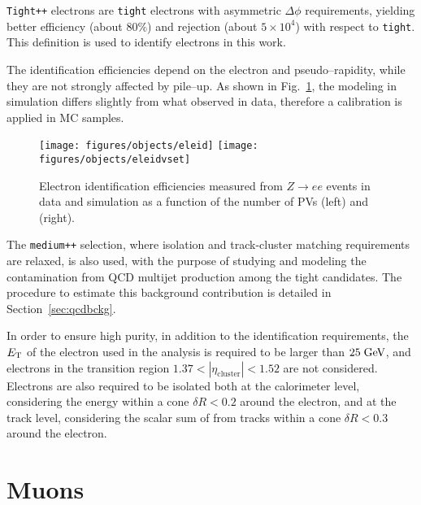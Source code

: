 \texttt{Tight++} electrons are \texttt{tight} electrons with
asymmetric $\Delta\phi$ requirements, yielding better efficiency
(about $80\%$) and rejection (about $5\times 10^4$) with respect to
\texttt{tight}. This definition is used to identify electrons in this
work.

The identification efficiencies depend on the electron \pt{} and
pseudo--rapidity, while they are not strongly affected by pile--up. As
shown in Fig.~\ref{fig:eleeff}, the modeling in simulation differs
slightly from what observed in data, therefore a calibration is
applied in MC samples.

\begin{figure}[htb!]\centering
  \texttt{[image: figures/objects/eleid]}
  \texttt{[image: figures/objects/eleidvset]}
  \caption{Electron identification efficiencies measured from
    $Z\to ee$ events in data and simulation as a function of the
    number of PVs (left) and ~\et{} (right).}
  \label{fig:eleeff}
\end{figure}

The \texttt{medium++} selection, where isolation and track-cluster matching
requirements are relaxed, is also used, with the purpose of studying
and modeling the contamination from QCD multijet production among the
tight candidates.
The procedure to estimate this background
contribution is detailed in Section~\ref{sec:qcdbckg}.

In order to ensure high purity, in addition to the identification
requirements, the $\mbox{\ensuremath{E_{\mathrm{T}}}}$ of the electron used in the analysis is required
to be larger than \mbox{$25 \; \mathrm{GeV}{}$}, and electrons in the transition
region $1.37<|\eta_{\mathrm{cluster}}|<1.52$ are not
considered. Electrons are also required to be isolated both at the
calorimeter level, considering the energy within a cone $\delta R<0.2$
around the electron, and at the track level, considering the scalar
sum of \pt{} from tracks within a cone $\delta R <0.3$ around the
electron. 

\section{Muons}
\label{sec:muons}

